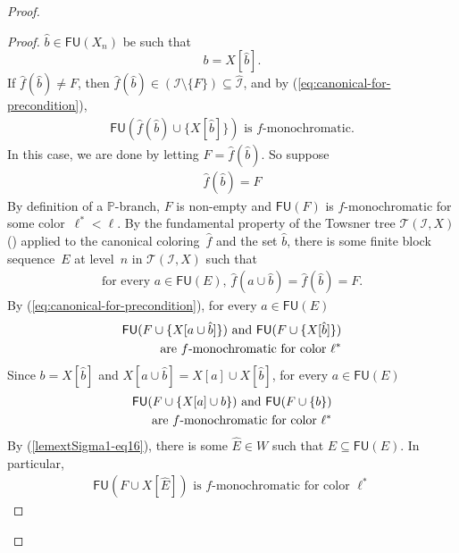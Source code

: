 \documentclass[10pt,a4paper]{article}
\def\PP{\mathbb{P}}
\def\Tc{\mathcal{T}}
\def\I{\mathcal{I}}
\newcommand{\NN}[0]{\mathbb{N}}
\newcommand{\Pfin}{\mathcal{P}_{\mathtt{fin}}}
\newcommand{\FU}[0]{\mathsf{FU}} %
\def\h#1{\hat{#1}}
\numberwithin{theorem}{section}
\begin{document}
\begin{proof}
\begin{proof}
$\hat b\in \FU(X_n)$
be such that
$$b = X[\h b].$$
If $\h f(\h b) \neq F$, then $\h f(\h b) \in (\I \setminus \{F\}) \subseteq \h \I$, and by (\ref{eq:canonical-for-precondition}),
\begin{align}\label{lemextSigma1-eq20-second-display}
\FU(\h f(\h b) \cup \{X[\h b]\})\text{ is $f$-monochromatic.}
\end{align}
In this case, we are done by letting $\h F = \h f(\h b)$. So suppose
\begin{align}\label{newlemextSigma1-good-color}
\h f(\h b) = F
\end{align}
By definition of a $\PP$-branch, $F$ is non-empty and $\FU(F)$ is $f$-monochromatic for some color~$\ell^* < \ell$.
By the fundamental property of the Towsner tree $\Tc(\I, X)$ () applied to the canonical coloring~$\h f$ and the set $\hat b$, there is some finite block sequence~$E$ at level~$n$ in $\Tc(\I, X)$ such that
\begin{align}\label{newlemextSigma1-eq2}
\text{for every $a \in \FU(E)$, $\h f(a \cup \h b) = \h f(\h b) = F$.} 
\end{align}
By (\ref{eq:canonical-for-precondition}), for every $a \in \FU(E)$
\begin{align}\label{newlemextSigma1-eq3}
\text{$\FU(F \cup \{X[a \cup \h b]\})$ and $\FU(F \cup \{X[\h b]\})$} \notag\\
\text{are $f$-monochromatic for color~$\ell^*$}
\end{align}
Since $b = X[\h b]$ and $X[a \cup \h b] = X[a] \cup X[\h b]$, for every $a \in \FU(E)$
\begin{align}\label{newlemextSigma1-eq5}
\text{$\FU(F \cup \{X[a] \cup b\})$ and $\FU(F \cup \{b\})$} \notag\\
\text{are $f$-monochromatic for color~$\ell^*$}
\end{align}
By (\ref{lemextSigma1-eq16}), there is some $\h E \in W$ such that $\h E \subseteq \FU(E)$. In particular, 
\begin{align}\label{newlemextSigma1-eq4}
\text{$\FU(F \cup X[\h E])$ is $f$-monochromatic for color~$\ell^*$}
\end{align}

\end{proof}
\end{proof}
\end{document}
